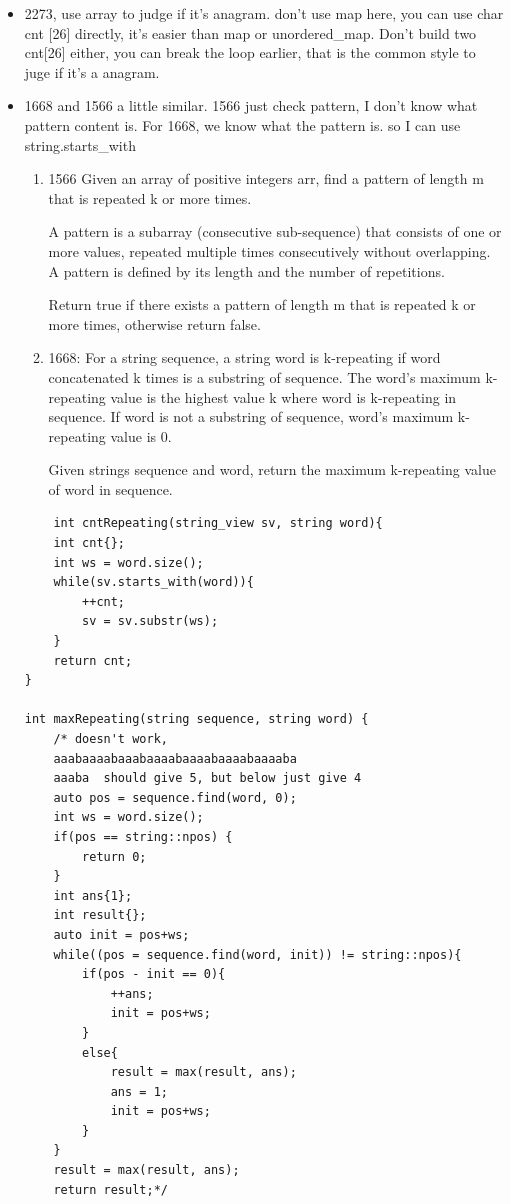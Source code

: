 \documentclass[a4paper,11pt,twoside]{book}
\begin{document}
\begin{itemize}
	
	\item 2273, use array to judge if it's anagram. don't use map here, you can use char cnt [26] directly, it's easier than map or unordered\_map.  Don't build two cnt[26] either, you can break the loop earlier, that is the common style to juge if it's a anagram. 

		
	\item 1668 and 1566 a little similar. 1566 just check pattern, I don't know what pattern content is. For 1668, we know what the pattern is. so I can use string.starts\_with
\begin{enumerate}
	\item 1566 Given an array of positive integers arr, find a pattern of length m that is repeated k or more times.
	
	A pattern is a subarray (consecutive sub-sequence) that consists of one or more values, repeated multiple times consecutively without overlapping. A pattern is defined by its length and the number of repetitions.
	
	Return true if there exists a pattern of length m that is repeated k or more times, otherwise return false.
	
	\item 1668: For a string sequence, a string word is k-repeating if word concatenated k times is a substring of sequence. The word's maximum k-repeating value is the highest value k where word is k-repeating in sequence. If word is not a substring of sequence, word's maximum k-repeating value is 0.
	
	Given strings sequence and word, return the maximum k-repeating value of word in sequence.
\end{enumerate}
		
	
\begin{lstlisting}
    int cntRepeating(string_view sv, string word){
	int cnt{};
	int ws = word.size();
	while(sv.starts_with(word)){
		++cnt;
		sv = sv.substr(ws);
	}
	return cnt;
}

int maxRepeating(string sequence, string word) {
	/* doesn't work, 
	aaabaaaabaaabaaaabaaaabaaaabaaaaba
	aaaba  should give 5, but below just give 4
	auto pos = sequence.find(word, 0);
	int ws = word.size();
	if(pos == string::npos) {
		return 0;
	}
	int ans{1};
	int result{};
	auto init = pos+ws;
	while((pos = sequence.find(word, init)) != string::npos){
		if(pos - init == 0){
			++ans;
			init = pos+ws;
		}
		else{
			result = max(result, ans);
			ans = 1;
			init = pos+ws;
		}
	}
	result = max(result, ans);
	return result;*/
	

\end{lstlisting}
\end{itemize}
\end{document}
